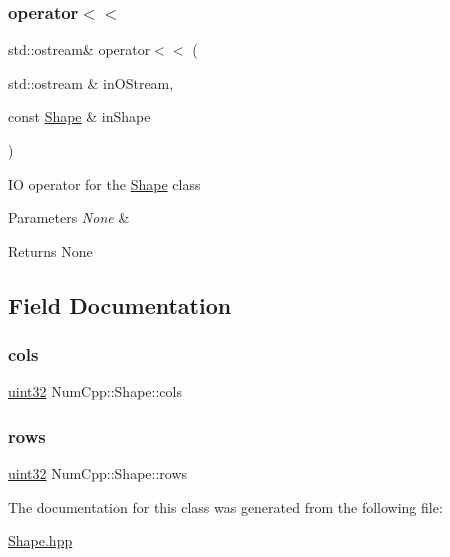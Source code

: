 \subsubsection{\texorpdfstring{operator$<$$<$}{operator<<}}
{\footnotesize\ttfamily std\+::ostream\& operator$<$$<$ (\begin{DoxyParamCaption}\item[{std\+::ostream \&}]{in\+O\+Stream,  }\item[{const \mbox{\hyperlink{class_num_cpp_1_1_shape}{Shape}} \&}]{in\+Shape }\end{DoxyParamCaption})\hspace{0.3cm}{\ttfamily [friend]}}

IO operator for the \mbox{\hyperlink{class_num_cpp_1_1_shape}{Shape}} class


\begin{DoxyParams}{Parameters}
{\em None} & \\
\hline
\end{DoxyParams}
\begin{DoxyReturn}{Returns}
None 
\end{DoxyReturn}


\subsection{Field Documentation}
\mbox{\label{class_num_cpp_1_1_shape_af652ab5cc158f4ddff5f351b07886f6a}} 
\subsubsection{\texorpdfstring{cols}{cols}}
{\footnotesize\ttfamily \mbox{\hyperlink{namespace_num_cpp_a36f388e948380413c63011cab9b7fbd5}{uint32}} Num\+Cpp\+::\+Shape\+::cols}

\mbox{\label{class_num_cpp_1_1_shape_ac2bbb80a615e9a66121a89ec699973ad}} 
\subsubsection{\texorpdfstring{rows}{rows}}
{\footnotesize\ttfamily \mbox{\hyperlink{namespace_num_cpp_a36f388e948380413c63011cab9b7fbd5}{uint32}} Num\+Cpp\+::\+Shape\+::rows}



The documentation for this class was generated from the following file\+:\begin{DoxyCompactItemize}
\item 
\mbox{\hyperlink{_shape_8hpp}{Shape.\+hpp}}\end{DoxyCompactItemize}
